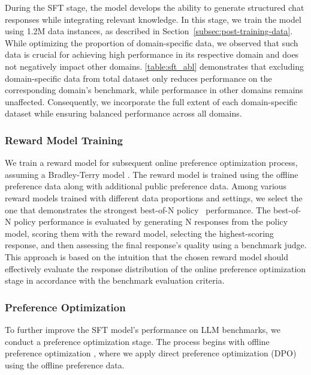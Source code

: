 During the SFT stage, the model develops the ability to generate structured chat responses while integrating relevant knowledge.
In this stage, we train the model using 1.2M data instances, as described in Section~\ref{subsec:post-training-data}.
While optimizing the proportion of domain-specific data, we observed that such data is crucial for achieving high performance in its respective domain and does not negatively impact other domains.
\autoref{table:sft_abl} demonstrates that excluding domain-specific data from total dataset only reduces performance on the corresponding domain's benchmark, while performance in other domains remains unaffected.
Consequently, we incorporate the full extent of each domain-specific dataset while ensuring balanced performance across all domains.




\subsubsection{Reward Model Training} \label{subsec:reward-model-training}

We train a reward model for subsequent online preference optimization process, assuming a Bradley-Terry model \citep{bradley1952rank}.
The reward model is trained using the offline preference data along with additional public preference data.
Among various reward models trained with different data proportions and settings, we select the one that demonstrates the strongest best-of-N policy~\citep{gao2023reward-model-overoptimization} performance.
The best-of-N policy performance is evaluated by generating N responses from the policy model, scoring them with the reward model, selecting the highest-scoring response, and then assessing the final response's quality using a benchmark judge.
This approach is based on the intuition that the chosen reward model should effectively evaluate the response distribution of the online preference optimization stage in accordance with the benchmark evaluation criteria.




\subsubsection{Preference Optimization} \label{subsec:preference-optimization}

To further improve the SFT model’s performance on LLM benchmarks, we conduct a preference optimization stage. 
The process begins with offline preference optimization \citep{meng2024simpo, jung2024bco}, where we apply direct preference optimization (DPO)~\citep{rafailov2023direct} using the offline preference data.




